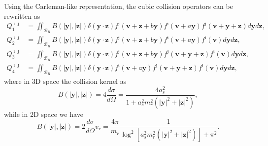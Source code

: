 Using the Carleman-like representation, the cubic collision operators can be rewritten as
\begin{equation}
\begin{aligned}
Q_1^{\imath\jmath}&=\iint_{\mathcal{B}_R}B(|\bm{y}|,|\bm{z}|)\delta(\bm{y}\cdot\bm{z}) 
f^\jmath(\bm{v}+\bm{z}+b\bm{y})f^\imath(\bm{v}+a\bm{y}) f^\jmath(\bm{v}+\bm{y}+\bm{z})d\bm{y}d\bm{z}, \\
Q_2^{\imath\jmath}&=\iint_{\mathcal{B}_R}B(|\bm{y}|,|\bm{z}|)\delta(\bm{y}\cdot\bm{z})  f^\jmath(\bm{v}+\bm{z}+b\bm{y})f^\imath(\bm{v}+a\bm{y}) f^\imath(\bm{v})d\bm{y}d\bm{z}, \\
Q_3^{\imath\jmath}&=\iint_{\mathcal{B}_R}B(|\bm{y}|,|\bm{z}|)\delta(\bm{y}\cdot\bm{z})  f^\jmath(\bm{v}+\bm{z}+b\bm{y}) f^\jmath(\bm{v}+\bm{y}+\bm{z})f^\imath(\bm{v})d\bm{y}d\bm{z}, \\
Q_4^{\imath\jmath}&=\iint_{\mathcal{B}_R}B(|\bm{y}|,|\bm{z}|)\delta(\bm{y}\cdot\bm{z})  f^\imath(\bm{v}+a\bm{y})   f^\jmath(\bm{v}+\bm{y}+\bm{z})f^\imath(\bm{v})d\bm{y}d\bm{z},
\end{aligned}
\end{equation}
where in 3D space the collision kernel as
\begin{equation}\label{three_d_s2}
B(|\bm{y}|,|\bm{z}|)=4\frac{d\sigma}{d\Omega}=
\frac{4a^2_s}{1+a^2_sm^2_r(|\bm{y}|^2+|\bm{z}|^2)},
\end{equation}
while in 2D space we have 
\begin{equation}\label{two_d_s2}
B(|\bm{y}|,|\bm{z}|)=2\frac{d\sigma}{d\Omega}{v_r}=\frac{4\pi}{m_r}\frac{1}{\log^2[a^2_sm^2_r(|\bm{y}|^2+|\bm{z}|^2)]+\pi^2}.
\end{equation}





